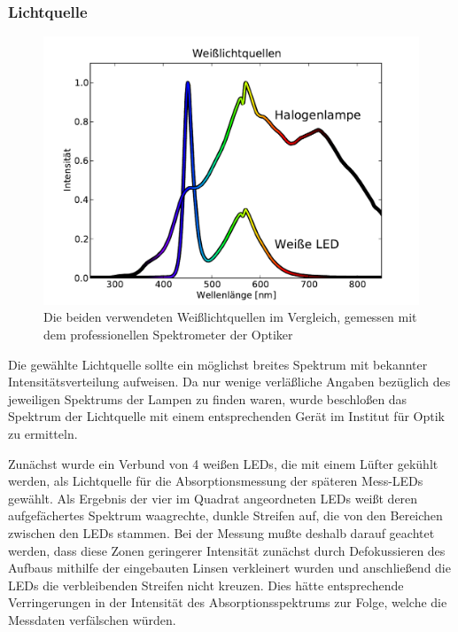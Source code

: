 \documentclass[11pt]{scrartcl}
\begin{document}
\subsubsection{Lichtquelle} %
\begin{figure}[ht]
\begin{center}
\includegraphics[width=1\textwidth]{images/quellspektren.pdf}
\end{center}
\vspace{-1.5\baselineskip}
\caption{Die beiden verwendeten Weißlichtquellen im Vergleich, gemessen mit dem professionellen Spektrometer der Optiker}
\label{fig:lichtquelle}
\end{figure}
Die gew\"ahlte Lichtquelle sollte ein m\"oglichst breites Spektrum mit bekannter Intensit\"atsverteilung aufweisen. Da nur wenige verl\"a\ss{}liche Angaben bez\"uglich des jeweiligen Spektrums der Lampen zu finden waren, wurde beschlo\ss{}en das Spektrum der Lichtquelle mit einem entsprechenden Ger\"at im Institut f\"ur Optik zu ermitteln.

Zun\"achst wurde ein Verbund von 4 wei\ss{}en LEDs, die mit einem L\"ufter gek\"uhlt werden, als Lichtquelle f\"ur die Absorptionsmessung der sp\"ateren Mess-LEDs gew\"ahlt. Als Ergebnis der vier im Quadrat angeordneten LEDs wei\ss{}t deren aufgef\"achertes Spektrum waagrechte, dunkle Streifen auf, die von den Bereichen zwischen den LEDs stammen. Bei der Messung mu\ss{}te deshalb darauf geachtet werden, dass diese Zonen geringerer Intensit\"at zun\"achst durch Defokussieren des Aufbaus mithilfe der eingebauten Linsen verkleinert wurden und anschlie\ss{}end die LEDs die verbleibenden Streifen nicht kreuzen. Dies h\"atte entsprechende Verringerungen in der Intensit\"at des Absorptionsspektrums zur Folge, welche die Messdaten verf\"alschen w\"urden.
\end{document}
